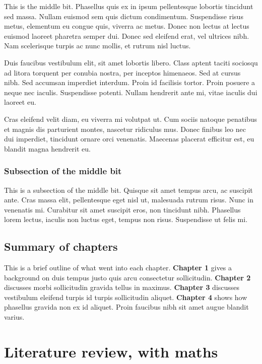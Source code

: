 \documentclass[12pt,a4paper,]{report}
\begin{document}
This is the middle bit. Phasellus quis ex in ipsum pellentesque lobortis
tincidunt sed massa. Nullam euismod sem quis dictum condimentum.
Suspendisse risus metus, elementum eu congue quis, viverra ac metus.
Donec non lectus at lectus euismod laoreet pharetra semper dui. Donec
sed eleifend erat, vel ultrices nibh. Nam scelerisque turpis ac nunc
mollis, et rutrum nisl luctus.

Duis faucibus vestibulum elit, sit amet lobortis libero. Class aptent
taciti sociosqu ad litora torquent per conubia nostra, per inceptos
himenaeos. Sed at cursus nibh. Sed accumsan imperdiet interdum. Proin id
facilisis tortor. Proin posuere a neque nec iaculis. Suspendisse
potenti. Nullam hendrerit ante mi, vitae iaculis dui laoreet eu.

Cras eleifend velit diam, eu viverra mi volutpat ut. Cum sociis natoque
penatibus et magnis dis parturient montes, nascetur ridiculus mus. Donec
finibus leo nec dui imperdiet, tincidunt ornare orci venenatis. Maecenas
placerat efficitur est, eu blandit magna hendrerit eu.

\hypertarget{subsection-of-the-middle-bit}{%
\subsection{Subsection of the middle
bit}\label{subsection-of-the-middle-bit}}

This is a subsection of the middle bit. Quisque sit amet tempus arcu, ac
suscipit ante. Cras massa elit, pellentesque eget nisl ut, malesuada
rutrum risus. Nunc in venenatis mi. Curabitur sit amet suscipit eros,
non tincidunt nibh. Phasellus lorem lectus, iaculis non luctus eget,
tempus non risus. Suspendisse ut felis mi.

\hypertarget{summary-of-chapters}{%
\section{Summary of chapters}\label{summary-of-chapters}}

This is a brief outline of what went into each chapter. \textbf{Chapter
1} gives a background on duis tempus justo quis arcu consectetur
sollicitudin. \textbf{Chapter 2} discusses morbi sollicitudin gravida
tellus in maximus. \textbf{Chapter 3} discusses vestibulum eleifend
turpis id turpis sollicitudin aliquet. \textbf{Chapter 4} shows how
phasellus gravida non ex id aliquet. Proin faucibus nibh sit amet augue
blandit varius.

\hypertarget{literature-review-with-maths}{%
\chapter{Literature review, with
maths}\label{literature-review-with-maths}}
\end{document}
